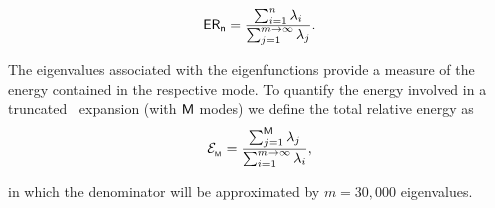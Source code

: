 \begin{equation}
 \mathsf{ER_{n}} = \dfrac{\sum_{i=1}^{n}\lambda_{i}}{\sum_{j=1}^{m\rightarrow\infty}\lambda_{j}}.
\end{equation}




The eigenvalues associated with the eigenfunctions provide
a measure of the energy contained in the respective mode.
To quantify the energy involved in a truncated \kl\ expansion (with $\textsf{M}$ modes) we define the total relative energy as
\begin{equation}
 \mathcal{E}_{_{\textsf{M}}} = \dfrac{\sum_{j=1}^{\textsf{M}}\lambda_{j}}{\sum_{i=1}^{m\rightarrow\infty}\lambda_{i}},
\end{equation}

\noindent in which the denominator will be approximated by $m=30,000$ eigenvalues.


